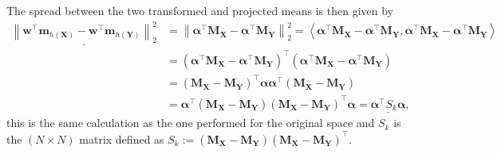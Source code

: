 \documentclass[a4paper, 12pt]{scrartcl}
\newcommand{\bfw}{\mathbf{w}}
\newcommand{\bfX}{\mathbf{X}}
\newcommand{\bfY}{\mathbf{Y}}
\newcommand{\bfmhX}{\mathbf{m}_{h\left(\bfX\right)}}
\newcommand{\bfmhY}{\mathbf{m}_{h\left(\bfY\right)}}
\newcommand{\ltwo}[1]{\left\| #1 \right\|_2}
\newcommand{\inner}[2]{\left\langle #1, #2 \right\rangle}
\newcommand{\bfalpha}{\boldsymbol{\alpha}}
\begin{document}
The spread between the two transformed and projected means is then given by
\begin{align*}
\underline{\ltwo{\bfw^\intercal\bfmhX-\bfw^\intercal\bfmhY}^2} &= \ltwo{\bfalpha^\intercal\mathbf{M}_\bfX - \bfalpha^\intercal\mathbf{M}_\bfY}^2=\inner{\bfalpha^\intercal\mathbf{M}_\bfX - \bfalpha^\intercal\mathbf{M}_\bfY}{\bfalpha^\intercal\mathbf{M}_\bfX - \bfalpha^\intercal\mathbf{M}_\bfY}\\
&=\left(\bfalpha^\intercal\mathbf{M}_\bfX - \bfalpha^\intercal\mathbf{M}_\bfY\right)^\intercal\left(\bfalpha^\intercal\mathbf{M}_\bfX - \bfalpha^\intercal\mathbf{M}_\bfY\right)\\
&=\left(\mathbf{M}_\bfX - \mathbf{M}_\bfY\right)^\intercal\bfalpha\bfalpha^\intercal\left(\mathbf{M}_\bfX - \mathbf{M}_\bfY\right)\\
&=\bfalpha^\intercal\left(\mathbf{M}_\bfX - \mathbf{M}_\bfY\right)\left(\mathbf{M}_\bfX - \mathbf{M}_\bfY\right)^\intercal\bfalpha = \underline{\bfalpha^\intercal S_k\bfalpha},
\end{align*}
this is the same calculation as the one performed for the original space and $S_k$ is the $\left(N\times N\right)$ matrix defined as $S_k:=\left(\mathbf{M}_\bfX - \mathbf{M}_\bfY\right)\left(\mathbf{M}_\bfX - \mathbf{M}_\bfY\right)^\intercal$.
\end{document}
